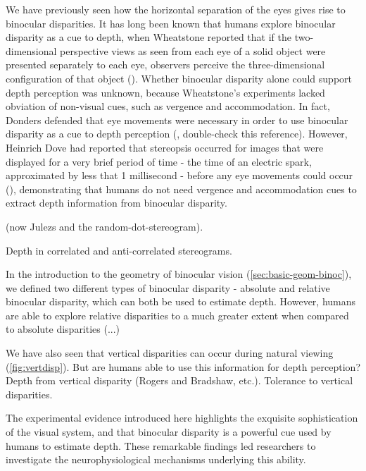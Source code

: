 \documentclass[oneside,12pt]{classes/CUEDthesisPSnPDF}
\begin{document}
We have previously seen how the horizontal separation of the eyes gives rise to binocular disparities. It has long been known that humans explore binocular disparity as a cue to depth, when Wheatstone reported that if the two-dimensional perspective views as seen from each eye of a solid object were presented separately to each eye, observers perceive the three-dimensional configuration of that object (\cite{Wheatstone:1838xf}). Whether binocular disparity alone could support depth perception was unknown, because Wheatstone's experiments lacked obviation of non-visual cues, such as vergence and accommodation. In fact, Donders defended that eye movements were necessary in order to use binocular disparity as a cue to depth perception (\cite{Donders1867}, double-check this reference). However, Heinrich Dove had reported that stereopsis occurred for images that were displayed for a very brief period of time - the time of an electric spark, approximated by less that 1 millisecond - before any eye movements could occur (\cite{Dove1841,Dove1860}), demonstrating that humans do not need vergence and accommodation cues to extract depth information from binocular disparity. 

(now Julezs and the random-dot-stereogram).

Depth in correlated and anti-correlated stereograms.



In the introduction to the geometry of binocular vision (\ref{sec:basic-geom-binoc}), we defined two different types of binocular disparity - absolute and relative binocular disparity, which can both be used to estimate depth. However, humans are able to explore relative disparities to a much greater extent when compared to absolute disparities (...)   

We have also seen that vertical disparities can occur during natural viewing (\ref{fig:vertdisp}). But are humans able to use this information for depth perception? 
Depth from vertical disparity (Rogers and Bradshaw, etc.).
Tolerance to vertical disparities.

The experimental evidence introduced here highlights the exquisite sophistication of the visual system, and that binocular disparity is a powerful cue used by humans to estimate depth. These remarkable findings led researchers to investigate the neurophysiological mechanisms underlying this ability.
\end{document}
